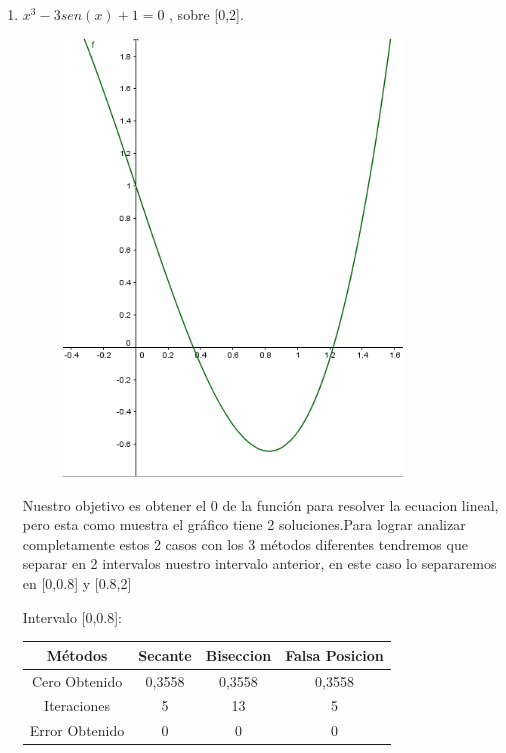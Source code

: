 \documentclass{udparticle}
\begin{document}
\begin{enumerate}
\begin{enumerate}
    \item  \(x^3 - 3sen(x) +1 = 0\) , sobre [0,2].
        \begin{figure}[H]
            \centering
            \includegraphics[width=9cm]{GraficoEj1a}
        \end{figure}
        Nuestro objetivo es obtener el 0 de la función para resolver la ecuacion lineal, pero esta como muestra el gráfico tiene 2 soluciones.Para lograr analizar completamente estos 2 casos con los 3 métodos diferentes tendremos que separar en 2 intervalos nuestro intervalo anterior, en este caso lo separaremos en [0,0.8] y [0.8,2]\\
            \begin{table}[H]Intervalo [0,0.8]:
            \centering
                \begin{tabular} { |c|c|c|c|}
                \hline
                Métodos       & Secante & Biseccion & Falsa Posicion  \\
                \hline
                Cero Obtenido &  0,3558       &    0,3558       &      0,3558    \\
                \hline
                Iteraciones   &     5        &      13     &        5          \\
                \hline
                Error Obtenido &       0      &       0      &     0         \\
                 \hline
                \end{tabular}
            \end{table}
        

\end{enumerate}
\end{enumerate}
\end{document}
